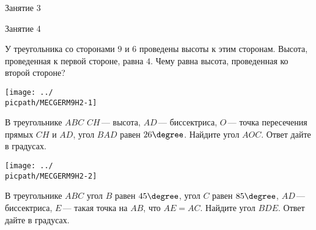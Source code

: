 \begin{class}[number=3]
	\begin{listofex}
		\item Занятие 3 
	\end{listofex}
\end{class}

\begin{class}[number=4]
	\begin{listofex}
		\item Занятие 4
	\end{listofex}
\end{class}

\begin{homework}[number=2]
	\begin{listofex}
		\item
		\begin{minipage}[t]{\bodywidth}
			У треугольника со сторонами \(9\) и \(6\) проведены высоты к этим сторонам. Высота, проведенная к первой стороне, равна \(4\). Чему равна высота, проведенная ко второй стороне?
		\end{minipage}
		\hspace{0.02\linewidth}
		\begin{minipage}[t]{\picwidth}
			\texttt{[image: ../\\picpath/MECGERM9H2-1]}
		\end{minipage}
		\item
		\begin{minipage}[t]{\bodywidth}
			В треугольнике \(ABC\) \(CH\) --- высота, \(AD\) --- биссектриса, \(O\) --- точка пересечения прямых \(CH\) и \(AD\), угол \(BAD\) равен \(26\degree \). Найдите угол \(AOC\). Ответ дайте в градусах.
		\end{minipage}
		\hspace{0.02\linewidth}
		\begin{minipage}[t]{\picwidth}
			\texttt{[image: ../\\picpath/MECGERM9H2-2]}
		\end{minipage}
		\item
		\begin{minipage}[t]{\bodywidth}
			В треугольнике \(ABC\) угол \(B\) равен \(45\degree \), угол \(C\) равен \(85\degree \), \(AD\) --- биссектриса, \(E\) --- такая точка на \(AB\), что \(AE  =  AC\). Найдите угол \(BDE\). Ответ дайте в градусах.
		\end{minipage}

\end{listofex}
\end{homework}
